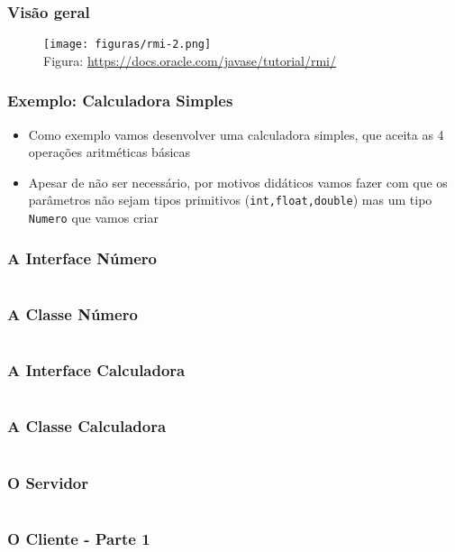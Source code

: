 \documentclass[Ligatures=TeX,table,brazil,svgnames,usetotalslideindicator,comp
ress,10pt]{beamer}
\begin{document}
\begin{frame}
  \frametitle{Visão geral}
  \begin{figure}[ht]
    \centering
    \texttt{[image: figuras/rmi-2.png]}
    \\\tiny{Figura: \url{https://docs.oracle.com/javase/tutorial/rmi/}}
  \end{figure}

\end{frame}


\begin{frame}
  \frametitle{Exemplo: Calculadora Simples}
  \begin{itemize}
  \item Como exemplo vamos desenvolver uma calculadora simples, que
    aceita as 4 operações aritméticas básicas
  \item Apesar de não ser necessário, por motivos didáticos vamos
    fazer com que os parâmetros não sejam tipos primitivos
    (\texttt{int,float,double}) mas um tipo \texttt{Numero} que vamos
    criar
  \end{itemize}

\end{frame}

\begin{frame}
  \frametitle{A Interface Número}
  \inputminted[linenos]{java}{Codigo/Aula02/Numero.java}
\end{frame}

\begin{frame}
  \frametitle{A Classe Número}
  \inputminted[linenos]{java}{Codigo/Aula02/NumeroImpl.java}
\end{frame}

\begin{frame}
  \frametitle{A Interface Calculadora}
  \inputminted[linenos]{java}{Codigo/Aula02/Calculadora.java}
\end{frame}

\begin{frame}
  \frametitle{A Classe Calculadora}
  {\footnotesize
    \inputminted[linenos]{java}{Codigo/Aula02/CalculadoraImpl.java}
    }
\end{frame}

\begin{frame}
  \frametitle{O Servidor}
  {\footnotesize
    \inputminted[linenos]{java}{Codigo/Aula02/ServidorCalculadora.java}
    }
\end{frame}

\begin{frame}
  \frametitle{O Cliente - Parte 1}
  {\footnotesize
    \inputminted[linenos, firstline=1,
    lastline=14]{java}{Codigo/Aula02/ClienteCalculadora.java}
  }
\end{frame}
\end{document}
